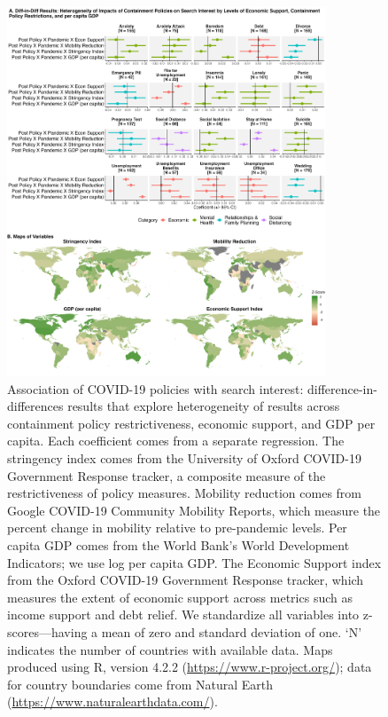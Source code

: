 \documentclass{article}
\begin{document}
\begin{figure}[H]
    \centering
    \includegraphics[width=0.85\textwidth]{figures/did_interact_map_120.png}
    \caption{Association of COVID-19 policies with search interest: difference-in-differences results that explore heterogeneity of results across containment policy restrictiveness, economic support, and GDP per capita. Each coefficient comes from a separate regression. The stringency index comes from the University of Oxford COVID-19 Government Response tracker, a composite measure of the restrictiveness of policy measures. Mobility reduction comes from Google COVID-19 Community Mobility Reports, which measure the percent change in mobility relative to pre-pandemic levels. Per capita GDP comes from the World Bank's World Development Indicators; we use log per capita GDP. The Economic Support index from the Oxford COVID-19 Government Response tracker, which measures the extent of economic support across metrics such as income support and debt relief. We standardize all variables into z-scores---having a mean of zero and standard deviation of one. `N' indicates the number of countries with available data. Maps produced using R, version 4.2.2 (\url{https://www.r-project.org/}); data for country boundaries come from Natural Earth (\url{https://www.naturalearthdata.com/}).}
    \label{fig:did_interact_map_120}
\end{figure}
\end{document}
